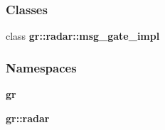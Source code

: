 \subsubsection*{Classes}
\begin{DoxyCompactItemize}
\item 
class {\bf gr\+::radar\+::msg\+\_\+gate\+\_\+impl}
\end{DoxyCompactItemize}
\subsubsection*{Namespaces}
\begin{DoxyCompactItemize}
\item 
 {\bf gr}
\item 
 {\bf gr\+::radar}
\end{DoxyCompactItemize}
